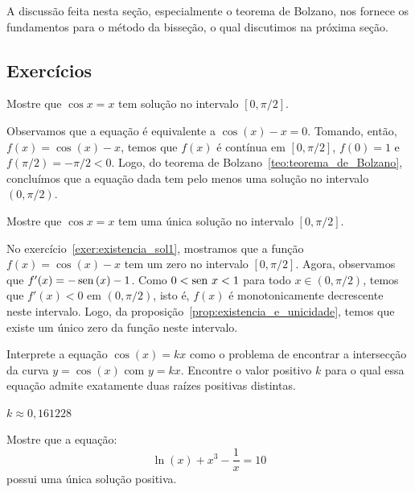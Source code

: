 A discussão feita nesta seção, especialmente o teorema de Bolzano, nos fornece os fundamentos para o método da bisseção, o qual discutimos na próxima seção.

\subsection*{Exercícios}
\begin{exer}\label{exer:existencia_sol1}
  Mostre que $\cos x = x$ tem solução no intervalo $[0, \pi/2]$.
\end{exer}
\begin{resp}
  
  Observamos que a equação é equivalente a $\cos(x) - x = 0$. Tomando, então, $f(x) = \cos(x) - x$, temos que $f(x)$ é contínua em $[0, \pi/2]$, $f(0) = 1$ e $f(\pi/2) = -\pi/2 < 0$. Logo, do teorema de Bolzano~\ref{teo:teorema_de_Bolzano}, concluímos que a equação dada tem pelo menos uma solução no intervalo $(0, \pi/2)$.    
  
\end{resp}

\begin{exer}
  Mostre que $\cos x = x$ tem uma única solução no intervalo $[0, \pi/2]$.
\end{exer}
\begin{resp}
  
    No exercício~\ref{exer:existencia_sol1}, mostramos que a função $f(x) = \cos(x) - x$ tem um zero no intervalo $[0, \pi/2]$. Agora, observamos que $f'(x) = -\operatorname{sen}\,(x) - 1$. Como $0 < \operatorname{sen}\, x < 1$ para todo $x\in (0, \pi/2)$, temos que $f'(x) < 0$ em $(0, \pi/2)$, isto é, $f(x)$ é monotonicamente decrescente neste intervalo. Logo, da proposição~\ref{prop:existencia_e_unicidade}, temos que existe um único zero da função neste intervalo.
  
\end{resp}

\begin{exer} Interprete a equação $\cos(x)=kx$ como o problema de encontrar a intersecção da curva $y=\cos(x)$ com $y=kx$. Encontre o valor positivo $k$ para o qual essa equação admite exatamente duas raízes positivas distintas.
\end{exer}
\begin{resp}
  
    $k\approx 0,161228$
  
\end{resp}


\begin{exer}Mostre que a equação:
  \begin{equation*}
    \ln(x)+x^3-\frac{1}{x}=10  
  \end{equation*}
possui uma única solução positiva.
\end{exer}

